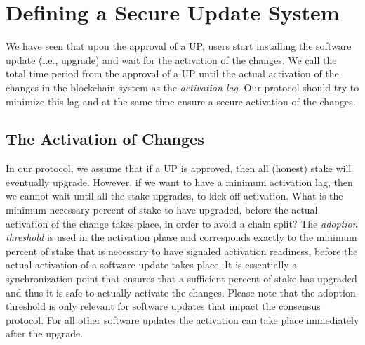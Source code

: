 \section{Defining a Secure Update System} \label{secureupdate}
We have seen that upon the approval of a UP, users start installing the software update (i.e., upgrade) and wait for the activation of the changes. We call the total  time period from the approval of a UP until the actual activation of the changes in the blockchain system as the \emph{activation lag}. Our protocol should try to minimize this lag and at the same time ensure a secure activation of the changes.


\subsection{The Activation of Changes}
In our protocol, we assume that if a UP is approved, then all (honest) stake will eventually upgrade. However, if we want to have a minimum activation lag, then we cannot wait until all the stake upgrades, to kick-off activation. What is the minimum necessary percent of stake to have upgraded, before the actual activation of the change takes place, in order to avoid a chain split? The \emph{adoption threshold} is used in the activation phase and corresponds exactly to the minimum percent of stake that is necessary to have signaled activation readiness, before the actual activation of a software update takes place. It is essentially a synchronization point that ensures that a sufficient percent of stake has upgraded and thus it is safe to actually activate the changes. 
 Please note that the adoption threshold is only relevant for software updates that impact the consensus protocol. For all other software updates the activation can take place immediately after the upgrade.

